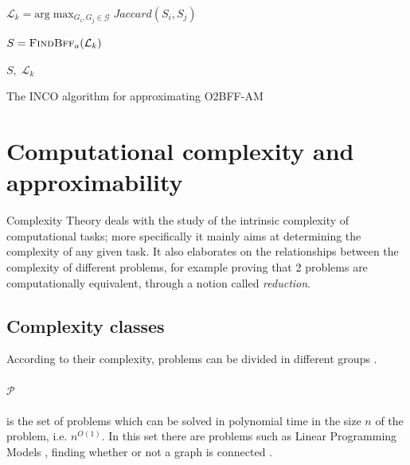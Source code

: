\begin{algorithm}
	\SetAlgoLined
	$\mathcal{L}_{k} = \text{arg}\max_{G_{i}, G_{j} \in \mathcal{G}}
		Jaccard(S_i, S_j) $ \;


	$S = \textsc{FindBff}_{a} (\mathcal{L}_{k}) $ \;

	\Return $S, \; \mathcal{L}_{k}  $ \;
	\caption{The \acrshort{INCO} algorithm for approximating
		\acrshort{O2BFF}-AM}
	\label{alg:inc_o_a}
\end{algorithm}

\section{Computational complexity and \\approximability}%
\label{sec:computational_complexity_and_approximability}

Complexity Theory deals with the study of the intrinsic complexity of
computational tasks; more specifically it mainly aims at determining the
complexity of any given task. It also elaborates on the relationships between
the complexity of different problems, for example proving that 2 problems are
computationally equivalent\cite{9780521884730}, through a notion called
\emph{reduction}.

\subsection{Complexity classes}%
\label{par:complexity_classes}

According to their complexity, problems can be divided in different groups
\cite{DemaineFall2014}.

\paragraph{$\mathcal{P} $}%
\label{par:p}
is the set of problems which can be solved in polynomial time in the size $n$ of
the problem, i.e. $n^{O(1)} $. In this set there are problems such as Linear
Programming Models \cite{KHACHIYAN198053}\cite{Karmarkar1984}, finding whether
or not a graph is connected \cite{9780521884730}.

